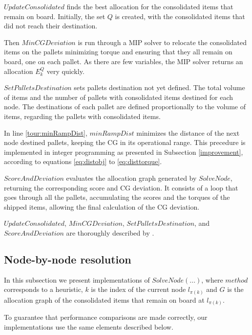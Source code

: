 \documentclass[preprint,authoryear]{elsarticle}
\begin{document}
$UpdateConsolidated$ finds the best allocation for the consolidated items that remain on board. Initially, the set $Q$ is created, with the consolidated items that did not reach their destination.

Then $MinCGDeviation$ is run through a MIP solver to relocate the consolidated items on the pallets minimizing torque and ensuring that they all remain on board, one on each pallet. As there are few variables, the MIP solver returns an allocation $E^Q_k$ very quickly.

$SetPalletsDestination$ sets pallets destination not yet defined. The total volume of items and the number of pallets with consolidated items destined for each node. The destinations of each pallet are defined proportionally to the volume of items, regarding the pallets with consolidated items.

In line \ref{tour:minRampDist}, $minRampDist$ minimizes the distance of the next node destined pallets, keeping the CG in its operational range. This precedure is implemented in integer programming as presented in Subsection \ref{improvement}, according to equations \ref{eq:distobj} to \ref{eq:disttorque}.

$ScoreAndDeviation$ evaluates the allocation graph generated by $SolveNode$, returning the corresponding score and CG deviation. It consists of a loop that goes through all the pallets, accumulating the scores and the torques of the shipped items, allowing the final calculation of the CG deviation.

$UpdateConsolidated$, $MinCGDeviation$, $SetPalletsDestination$, and $ScoreAndDeviation$ are thoroughly described by \cite{MesquitaSanches2023}.


\subsection{Node-by-node resolution}
\label{methods}


In this subsection we present implementations of $SolveNode(...)$, where $method$\/ corresponds to a heuristic, $k$\/ is the index of the current node $l_{\pi(k)}$ and $G$\/ is the allocation graph of the consolidated items that remain on board at $l_{\pi(k)}$.

To guarantee that performance comparisons are made correctly, our implementations use the same elements described below.

\end{document}
